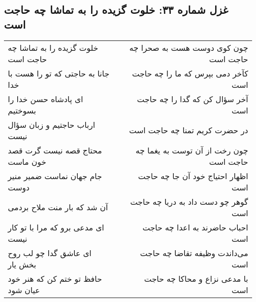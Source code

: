 \begin{center}
\section*{غزل شماره ۳۳: خلوت گزیده را به تماشا چه حاجت است}
\label{sec:sh033}
\begin{longtable}{l p{0.5cm} r}
خلوت گزیده را به تماشا چه حاجت است
&&
چون کوی دوست هست به صحرا چه حاجت است
\\
جانا به حاجتی که تو را هست با خدا
&&
کآخر دمی بپرس که ما را چه حاجت است
\\
ای پادشاه حسن خدا را بسوختیم
&&
آخر سؤال کن که گدا را چه حاجت است
\\
ارباب حاجتیم و زبان سؤال نیست
&&
در حضرت کریم تمنا چه حاجت است
\\
محتاج قصه نیست گرت قصد خون ماست
&&
چون رخت از آن توست به یغما چه حاجت است
\\
جام جهان نماست ضمیر منیر دوست
&&
اظهار احتیاج خود آن جا چه حاجت است
\\
آن شد که بار منت ملاح بردمی
&&
گوهر چو دست داد به دریا چه حاجت است
\\
ای مدعی برو که مرا با تو کار نیست
&&
احباب حاضرند به اعدا چه حاجت است
\\
ای عاشق گدا چو لب روح بخش یار
&&
می‌داندت وظیفه تقاضا چه حاجت است
\\
حافظ تو ختم کن که هنر خود عیان شود
&&
با مدعی نزاع و محاکا چه حاجت است
\\
\end{longtable}
\end{center}
